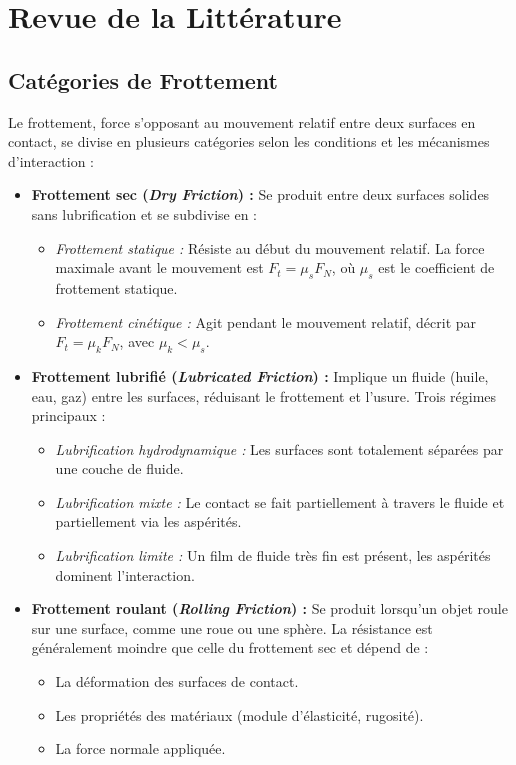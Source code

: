 \chapter{Revue de la Litt\'erature}

\section{Catégories de Frottement}

Le frottement, force s'opposant au mouvement relatif entre deux surfaces en contact, se divise en plusieurs catégories selon les conditions et les mécanismes d'interaction :

\begin{itemize}
    \item \textbf{Frottement sec (\textit{Dry Friction}) :}  
    Se produit entre deux surfaces solides sans lubrification et se subdivise en :
    \begin{itemize}
        \item \textit{Frottement statique :} Résiste au début du mouvement relatif. La force maximale avant le mouvement est \(F_t = \mu_s F_N\), où \(\mu_s\) est le coefficient de frottement statique.
        \item \textit{Frottement cinétique :} Agit pendant le mouvement relatif, décrit par \(F_t = \mu_k F_N\), avec \(\mu_k < \mu_s\).
    \end{itemize}

    \item \textbf{Frottement lubrifié (\textit{Lubricated Friction}) :}  
    Implique un fluide (huile, eau, gaz) entre les surfaces, réduisant le frottement et l'usure. Trois régimes principaux :
    \begin{itemize}
        \item \textit{Lubrification hydrodynamique :} Les surfaces sont totalement séparées par une couche de fluide.
        \item \textit{Lubrification mixte :} Le contact se fait partiellement à travers le fluide et partiellement via les aspérités.
        \item \textit{Lubrification limite :} Un film de fluide très fin est présent, les aspérités dominent l'interaction.
    \end{itemize}

    \item \textbf{Frottement roulant (\textit{Rolling Friction}) :}  
    Se produit lorsqu’un objet roule sur une surface, comme une roue ou une sphère. La résistance est généralement moindre que celle du frottement sec et dépend de :
    \begin{itemize}
        \item La déformation des surfaces de contact.
        \item Les propriétés des matériaux (module d'élasticité, rugosité).
        \item La force normale appliquée.
    \end{itemize}


\end{itemize}
